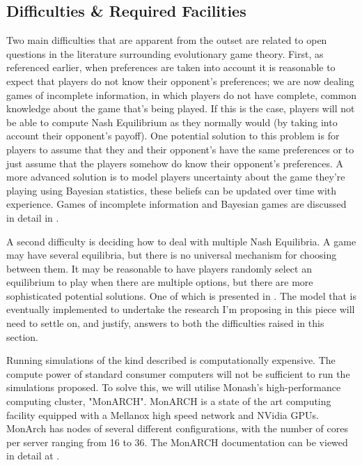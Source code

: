 \documentclass[11pt]{article}
\newcommand*{\np}{\par\noindent\newline}
\begin{document}
\subsection{Difficulties \& Required Facilities}
Two main difficulties that are apparent from the outset are related to open
questions in the literature surrounding evolutionary game theory. First, as
referenced earlier, when preferences are taken into account it is reasonable to
expect that players do not know their opponent's preferences; we are now
dealing games of incomplete information, in which players do not have complete,
common knowledge about the game that's being played. If this is the case, players will not be able to compute Nash Equilibrium as they normally
would (by taking into account their opponent's payoff). One potential solution
to this problem is for players to assume that they and their opponent's have
the same preferences or to just assume that the players somehow do know their
opponent's preferences. A more advanced solution is to model players
uncertainty about the game they're playing using Bayesian statistics, these
beliefs can be updated over time with experience. Games of incomplete
information and Bayesian games are discussed in detail in
\cite{shoham_multiagent_nodate}.
\np A second difficulty is deciding how to deal with multiple Nash
Equilibria. A game may have several equilibria, but there is no universal
mechanism for choosing between them. It may be reasonable to have players
randomly select an equilibrium to play when there are multiple options, but
there are more sophisticated potential solutions. One of which is presented in
\cite{binmore_evolutionary_1999}. The model that is eventually implemented to
undertake the research I'm proposing in this piece will need to
settle on, and justify, answers to both the difficulties raised in this section.
\np Running simulations of the kind described is computationally expensive. The
compute power of standard consumer computers will not be sufficient to run the
simulations proposed. To solve this, we will utilise Monash's high-performance
computing cluster, "MonARCH". MonARCH is a state of the art computing facility
equipped with a Mellanox high speed network and NVidia GPUs. MonArch has nodes
of several different configurations, with the number of cores per server
ranging from 16 to 36. The MonARCH documentation can be viewed in detail at
\cite{michnowicz_monarch_nodate}.
\end{document}
